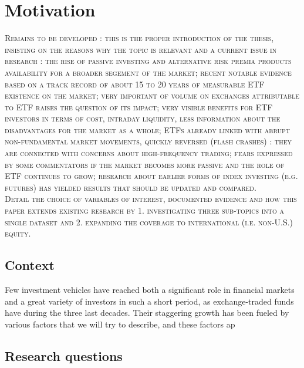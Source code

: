 \section{Motivation}
\label{sec:Motivation}
\begin{center}
  \textsc{Remains to be developed : this is the proper introduction of the thesis, insisting on the reasons why the topic is relevant and a current issue in research : the rise of passive investing and alternative risk premia products availability for a broader segement of the market; recent notable evidence based on a track record of about 15 to 20 years of measurable ETF existence on the market; very important of volume on exchanges attributable to ETF raises the question of its impact; very visible benefits for ETF investors in terms of cost, intraday liquidity, less information about the disadvantages for the market as a whole; ETFs already linked with abrupt non-fundamental market movements, quickly reversed (flash crashes) : they are connected with concerns about high-frequency trading; fears expressed by some commentators if the market becomes more passive and the role of ETF continues to grow; research about earlier forms of index investing (e.g. futures) has yielded results that should be updated and compared.\\Detail the choice of variables of interest, documented evidence and how this paper extends existing research by 1. investigating three sub-topics into a single dataset and 2. expanding the coverage to international (i.e. non-U.S.) equity.}
  \end{center}

\subsection{Context}
Few investment vehicles have reached both a significant role in financial markets and a great variety of investors in such a short period, as exchange-traded funds have during the three last decades. Their staggering growth has been fueled by various factors that we will try to describe, and these factors ap 
\subsection{Research questions}

